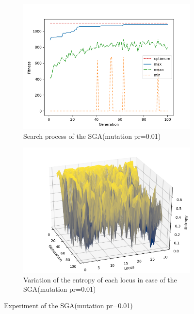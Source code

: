 \documentclass[onecolumn]{ujarticle}   %
\begin{document}
	\begin{figure}[h]
		\begin{subfigure}{0.49\columnwidth}
			\includegraphics[width=1.0\columnwidth]{figure/knapsackSGA_stats_mut_001_Np_64.png}
			\caption{Search process of the SGA(mutation pr=0.01)}
			\label{fig:searchprocessSGA}
		\end{subfigure}
		\begin{subfigure}{0.49\columnwidth}
			\includegraphics[width=1.0\columnwidth]{figure/knapsackSGA_mut_001_Np_64.png}
			\caption{Variation of the entropy of each locus in case of the SGA(mutation pr=0.01)}
			\label{fig:entropySGA}
		\end{subfigure}
		\caption{Experiment of the SGA(mutation pr=0.01)}
	\end{figure}
\end{document}
